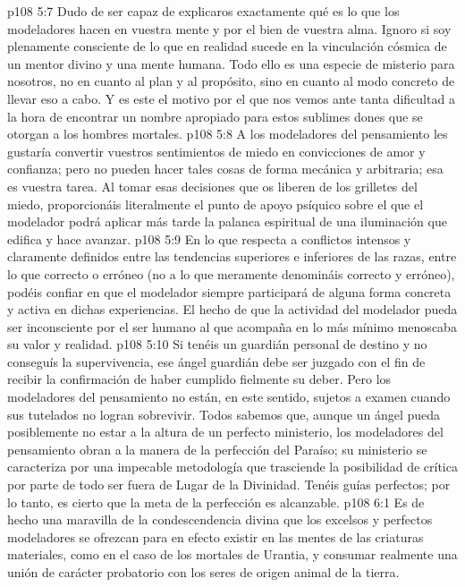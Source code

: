 \vs p108 5:7 Dudo de ser capaz de explicaros exactamente qué es lo que los modeladores hacen en vuestra mente y por el bien de vuestra alma. Ignoro si soy plenamente consciente de lo que en realidad sucede en la vinculación cósmica de un mentor divino y una mente humana. Todo ello es una especie de misterio para nosotros, no en cuanto al plan y al propósito, sino en cuanto al modo concreto de llevar eso a cabo. Y es este el motivo por el que nos vemos ante tanta dificultad a la hora de encontrar un nombre apropiado para estos sublimes dones que se otorgan a los hombres mortales.
\vs p108 5:8 A los modeladores del pensamiento les gustaría convertir vuestros sentimientos de miedo en convicciones de amor y confianza; pero no pueden hacer tales cosas de forma mecánica y arbitraria; esa es vuestra tarea. Al tomar esas decisiones que os liberen de los grilletes del miedo, proporcionáis literalmente el punto de apoyo psíquico sobre el que el modelador podrá aplicar más tarde la palanca espiritual de una iluminación que edifica y hace avanzar.
\vs p108 5:9 En lo que respecta a conflictos intensos y claramente definidos entre las tendencias superiores e inferiores de las razas, entre lo que  correcto o erróneo (no a lo que meramente denomináis correcto y erróneo), podéis confiar en que el modelador siempre participará de alguna forma concreta y activa en dichas experiencias. El hecho de que la actividad del modelador pueda ser inconsciente por el ser humano al que acompaña en lo más mínimo menoscaba su valor y realidad.
\vs p108 5:10 Si tenéis un guardián personal de destino y no conseguís la supervivencia, ese ángel guardián debe ser juzgado con el fin de recibir la confirmación de haber cumplido fielmente su deber. Pero los modeladores del pensamiento no están, en este sentido, sujetos a examen cuando sus tutelados no logran sobrevivir. Todos sabemos que, aunque un ángel pueda posiblemente no estar a la altura de un perfecto ministerio, los modeladores del pensamiento obran a la manera de la perfección del Paraíso; su ministerio se caracteriza por una impecable metodología que trasciende la posibilidad de crítica por parte de todo ser fuera de Lugar de la Divinidad. Tenéis guías perfectos; por lo tanto, es cierto que la meta de la perfección es alcanzable.
\vs p108 6:1 Es de hecho una maravilla de la condescendencia divina que los excelsos y perfectos modeladores se ofrezcan para en efecto existir en las mentes de las criaturas materiales, como en el caso de los mortales de Urantia, y consumar realmente una unión de carácter probatorio con los seres de origen animal de la tierra.
